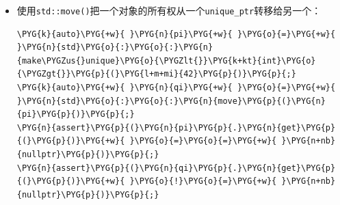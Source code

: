 \begin{itemize}
\begin{codeblockbg}
\begin{Verbatim}[commandchars=\\\{\},breaklines=true,breakanywhere=true,fontsize=\codefont,xleftmargin=17bp]
\PYG{k}{struct}\PYG{+w}{ }\PYG{n+nc}{foo\PYGZus{}deleter}
\PYG{p}{\PYGZob{}}
\PYG{+w}{  }\PYG{k+kt}{void}\PYG{+w}{ }\PYG{n+nf}{operator}\PYG{p}{(}\PYG{p}{)}\PYG{p}{(}\PYG{n}{foo}\PYG{o}{*}\PYG{+w}{ }\PYG{n}{pf}\PYG{p}{)}\PYG{+w}{ }\PYG{k}{const}
\PYG{+w}{  }\PYG{p}{\PYGZob{}}
\PYG{+w}{    }\PYG{n}{std}\PYG{o}{:}\PYG{o}{:}\PYG{n}{cout}\PYG{+w}{ }\PYG{o}{\PYGZlt{}}\PYG{o}{\PYGZlt{}}\PYG{+w}{ }\PYG{l+s}{\PYGZdq{}}\PYG{l+s}{deleting foo...}\PYG{l+s}{\PYGZdq{}}\PYG{+w}{ }\PYG{o}{\PYGZlt{}}\PYG{o}{\PYGZlt{}}\PYG{+w}{ }\PYG{n}{std}\PYG{o}{:}\PYG{o}{:}\PYG{n}{endl}\PYG{p}{;}
\PYG{+w}{    }\PYG{k}{delete}\PYG{+w}{ }\PYG{n}{pf}\PYG{p}{;}
\PYG{+w}{  }\PYG{p}{\PYGZcb{}}
\PYG{p}{\PYGZcb{}}\PYG{p}{;}
\PYG{n}{std}\PYG{o}{:}\PYG{o}{:}\PYG{n}{unique\PYGZus{}ptr}\PYG{o}{\PYGZlt{}}\PYG{n}{foo}\PYG{p}{,}\PYG{+w}{ }\PYG{n}{foo\PYGZus{}deleter}\PYG{o}{\PYGZgt{}}\PYG{+w}{ }\PYG{n}{pf}\PYG{p}{(}\PYG{k}{new}\PYG{+w}{ }\PYG{n}{foo}\PYG{p}{(}\PYG{l+m+mi}{42}\PYG{p}{,}\PYG{+w}{ }\PYG{l+m+mf}{42.0}\PYG{p}{,}\PYG{+w}{ }\PYG{l+s}{\PYGZdq{}}\PYG{l+s}{42}\PYG{l+s}{\PYGZdq{}}\PYG{p}{)}\PYG{p}{,}
\PYG{+w}{                                     }\PYG{n}{foo\PYGZus{}deleter}\PYG{p}{(}\PYG{p}{)}\PYG{p}{)}\PYG{p}{;}
\end{Verbatim}
\end{codeblockbg}



\item 使用\texttt{std::\allowbreak{}move()}把一个对象的所有权从一个\texttt{unique\_\allowbreak{}ptr}转移给另一个：



\begin{codeblockbg}
\begin{Verbatim}[commandchars=\\\{\},breaklines=true,breakanywhere=true,fontsize=\codefont,xleftmargin=17bp]
\PYG{k}{auto}\PYG{+w}{ }\PYG{n}{pi}\PYG{+w}{ }\PYG{o}{=}\PYG{+w}{ }\PYG{n}{std}\PYG{o}{:}\PYG{o}{:}\PYG{n}{make\PYGZus{}unique}\PYG{o}{\PYGZlt{}}\PYG{k+kt}{int}\PYG{o}{\PYGZgt{}}\PYG{p}{(}\PYG{l+m+mi}{42}\PYG{p}{)}\PYG{p}{;}
\PYG{k}{auto}\PYG{+w}{ }\PYG{n}{qi}\PYG{+w}{ }\PYG{o}{=}\PYG{+w}{ }\PYG{n}{std}\PYG{o}{:}\PYG{o}{:}\PYG{n}{move}\PYG{p}{(}\PYG{n}{pi}\PYG{p}{)}\PYG{p}{;}
\PYG{n}{assert}\PYG{p}{(}\PYG{n}{pi}\PYG{p}{.}\PYG{n}{get}\PYG{p}{(}\PYG{p}{)}\PYG{+w}{ }\PYG{o}{=}\PYG{o}{=}\PYG{+w}{ }\PYG{n+nb}{nullptr}\PYG{p}{)}\PYG{p}{;}
\PYG{n}{assert}\PYG{p}{(}\PYG{n}{qi}\PYG{p}{.}\PYG{n}{get}\PYG{p}{(}\PYG{p}{)}\PYG{+w}{ }\PYG{o}{!}\PYG{o}{=}\PYG{+w}{ }\PYG{n+nb}{nullptr}\PYG{p}{)}\PYG{p}{;}
\end{Verbatim}
\end{codeblockbg}



\end{itemize}
